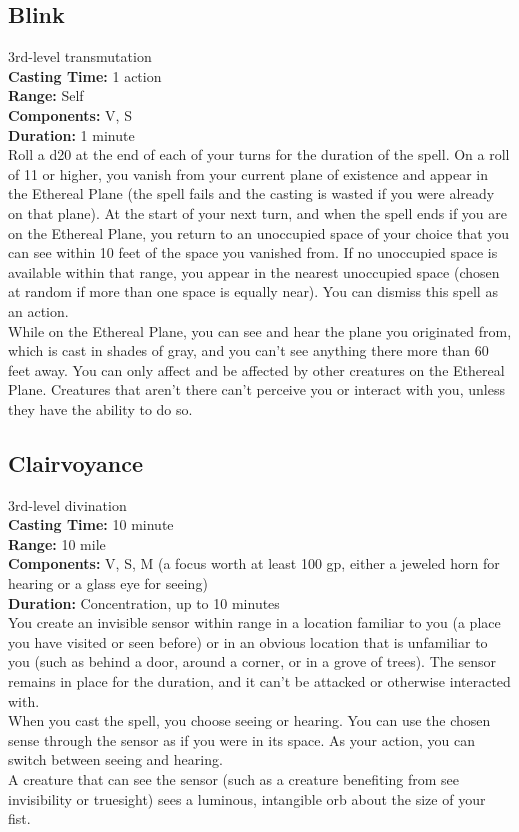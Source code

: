 \documentclass[11pt, A4paper, english]{article}
\begin{document}
		\subsection{Blink}
3rd-level transmutation \\
\textbf{Casting Time:} 1 action \\
\textbf{Range:} Self \\
\textbf{Components:} V, S \\
\textbf{Duration:} 1 minute \\
Roll a d20 at the end of each of your turns for the duration of the spell. On a roll of 11 or higher, you vanish from your current plane of existence and appear in the Ethereal Plane (the spell fails and the casting is wasted if you were already on that plane). At the start of your next turn, and when the spell ends if you are on the Ethereal Plane, you return to an unoccupied space of your choice that you can see within 10 feet of the space you vanished from. If no unoccupied space is available within that range, you appear in the nearest unoccupied space (chosen at random if more than one space is equally near). You can dismiss this spell as an action. \\
While on the Ethereal Plane, you can see and hear the plane you originated from, which is cast in shades of gray, and you can’t see anything there more than 60 feet away. You can only affect and be affected by other creatures on the Ethereal Plane. Creatures that aren’t there can’t perceive you or interact with you, unless they have the ability to do so.

		\subsection{Clairvoyance}
3rd-level divination \\
\textbf{Casting Time:} 10 minute \\
\textbf{Range:} 10 mile \\
\textbf{Components:} V, S, M (a focus worth at least 100 gp, either a jeweled horn for hearing or a glass eye for seeing) \\
\textbf{Duration:} Concentration, up to 10 minutes \\
You create an invisible sensor within range in a location familiar to you (a place you have visited or seen before) or in an obvious location that is unfamiliar to you (such as behind a door, around a corner, or in a grove of trees). The sensor remains in place for the duration, and it can’t be attacked or otherwise interacted with. \\
When you cast the spell, you choose seeing or hearing. You can use the chosen sense through the sensor as if you were in its space. As your action, you can switch between seeing and hearing. \\
A creature that can see the sensor (such as a creature benefiting from see invisibility or truesight) sees a luminous, intangible orb about the size of your fist.
\end{document}

